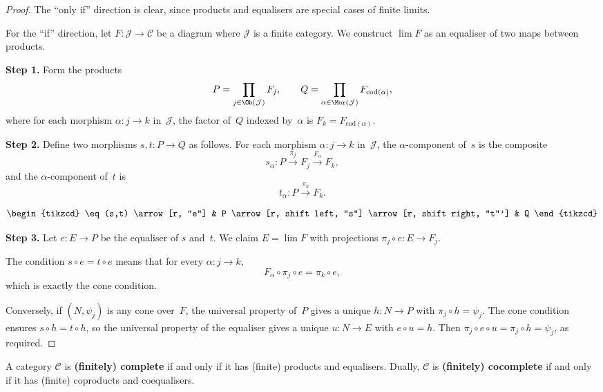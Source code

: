 \begin{proof}
The ``only if'' direction is clear, since products and equalisers are
special cases of finite limits.

For the ``if'' direction, let $F\colon\mathcal{J}\to\mathcal{C}$
be a diagram where $\mathcal{J}$ is a finite category.
We construct $\lim F$ as an equaliser of two maps between products.

\medskip\noindent
\textbf{Step 1.} Form the products
\[
    P = \prod_{j\in\Ob(\mathcal{J})} F_j,
    \qquad
    Q = \prod_{\alpha\in\Mor(\mathcal{J})} F_{\mathrm{cod}(\alpha)},
\]
where for each morphism $\alpha\colon j\to k$ in~$\mathcal{J}$,
the factor of~$Q$ indexed by~$\alpha$ is $F_k = F_{\mathrm{cod}(\alpha)}$.

\medskip\noindent
\textbf{Step 2.} Define two morphisms $s,t\colon P\to Q$ as follows.
For each morphism $\alpha\colon j\to k$ in~$\mathcal{J}$, the
$\alpha$-component of~$s$ is the composite
\[
    s_\alpha\colon P \xrightarrow{\pi_j} F_j \xrightarrow{F_\alpha} F_k,
\]
and the $\alpha$-component of~$t$ is
\[
    t_\alpha\colon P \xrightarrow{\pi_k} F_k.
\]

\[
\begin{tikzcd}
\eq(s,t) \arrow[r, "e"] & P \arrow[r, shift left, "s"] \arrow[r, shift right, "t"'] & Q
\end{tikzcd}
\]

\medskip\noindent
\textbf{Step 3.} Let $e\colon E\to P$ be the equaliser of $s$ and~$t$.
We claim $E = \lim F$ with projections
$\pi_j\circ e\colon E\to F_j$.

The condition $s\circ e = t\circ e$ means that for every
$\alpha\colon j\to k$,
\[
    F_\alpha \circ \pi_j \circ e = \pi_k \circ e,
\]
which is exactly the cone condition.

Conversely, if $(N,\psi_j)$ is any cone over~$F$, the universal property
of~$P$ gives a unique $h\colon N\to P$ with $\pi_j\circ h = \psi_j$.
The cone condition ensures $s\circ h = t\circ h$, so the universal
property of the equaliser gives a unique $u\colon N\to E$ with
$e\circ u = h$.
Then $\pi_j\circ e\circ u = \pi_j\circ h = \psi_j$, as required.
\end{proof}

\begin{corollary}\label{cor:complete-category}
A category $\mathcal{C}$ is \textbf{(finitely) complete} if and only if
it has (finite) products and equalisers.  Dually, $\mathcal{C}$ is
\textbf{(finitely) cocomplete} if and only if it has (finite) coproducts
and coequalisers.
\end{corollary}


